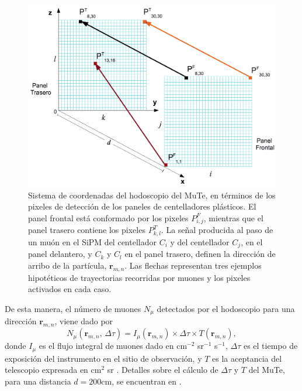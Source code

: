 \documentclass[12pt,oneside,openany,letter]{book}
\begin{document}
\begin{figure}[h!]
    \centering       
    \includegraphics[scale=0.5]{sistema_coo.png}
    
   \caption[Sistema de coordenadas del hodoscopio del MuTe]{Sistema de coordenadas del hodoscopio del MuTe, en términos de los pixeles de detección de los paneles de centelladores plásticos. El panel frontal está conformado por los pixeles $P^{F}_{i,j}$, mientras que el panel trasero contiene los pixeles $P^{T}_{k,l}$. La señal producida al paso de un muón en el SiPM del centellador $C_i$ y del centellador $C_j$, en el panel delantero, y $C_k$ y $C_l$ en el panel trasero, definen la dirección de arribo de la partícula, $\mathbf{r}_{m,n}$. Las flechas representan tres ejemplos hipotéticos de trayectorias recorridas por muones y los pixeles activados en cada caso.}\label{sistema_coo}
\end{figure}

De esta manera, el número de muones $N_{\mu}$ detectados por el hodoscopio para una dirección $\mathbf{r}_{m,n}$, viene dado por
\begin{equation}
\label{ecNumero}
N_{\mu}(\mathbf{r}_{m,n}, \, \Delta \tau)= I_{\mu}(\mathbf{r}_{m,n}) \times \Delta \tau \times T(\mathbf{r}_{m,n}),
\end{equation}
donde $I_{\mu}$ es el flujo integral de muones dado en cm$^{-2}$ sr$^{-1}$ s$^{-1}$,  $\Delta \tau$ es el tiempo de exposici\'on del instrumento en el sitio de observaci\'on, y $T$ es la aceptancia del telescopio expresada en cm$^2$ sr \cite{lesparre-etal2012-gim}. Detalles sobre el cálculo de $\Delta \tau$ y $T$ del MuTe, para una distancia $d=200$cm, se encuentran en \cite{MuTeSites}.
\end{document}
